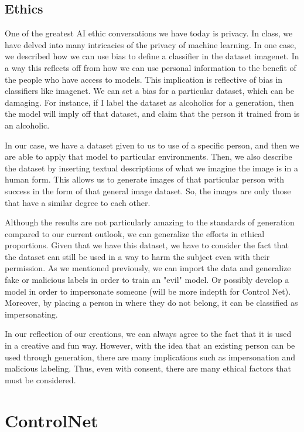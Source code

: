 \documentclass{article}
\begin{document}
\subsection{Ethics}
One of the greatest AI ethic conversations we have today is privacy. In class, we have delved into many intricacies of the privacy of machine learning. In one case, we described how we can use bias to define a classifier in the dataset imagenet. In a way this reflects off from how we can use personal information to the benefit of the people who have access to models. This implication is reflective of bias in classifiers like imagenet. We can set a bias for a particular dataset, which can be damaging. For instance, if I label the dataset as alcoholics for a generation, then the model will imply off that dataset, and claim that the person it trained from is an alcoholic. 

In our case, we have a dataset given to us to use of a specific person, and then we are able to apply that model to particular environments. Then, we also describe the dataset by inserting textual descriptions of what we imagine the image is in a human form. This allows us to generate images of that particular person with success in the form of that general image dataset. So, the images are only those that have a similar degree to each other. 

Although the results are not particularly amazing to the standards of generation compared to our current outlook, we can generalize the efforts in ethical proportions. Given that we have this dataset, we have to consider the fact that the dataset can still be used in a way to harm the subject even with their permission. As we mentioned previously, we can import the data and generalize fake or malicious labels in order to train an "evil" model. Or possibly develop a model in order to impersonate someone (will be more indepth for Control Net). Moreover, by placing a person in where they do not belong, it can be classified as impersonating.

In our reflection of our creations, we can always agree to the fact that it is used in a creative and fun way. However, with the idea that an existing person can be used through generation, there are many implications such as impersonation and malicious labeling. Thus, even with consent, there are many ethical factors that must be considered.

\clearpage

\section{ControlNet}
\end{document}

